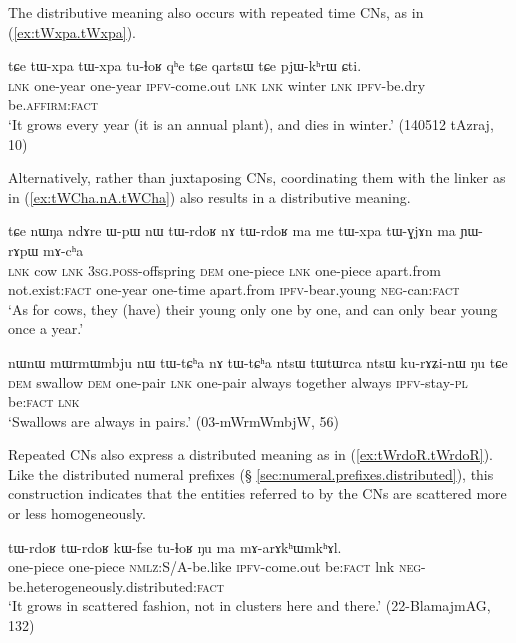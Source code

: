 The distributive meaning also occurs with repeated time CNs, as in (\ref{ex:tWxpa.tWxpa}).

\begin{exe}
\ex \label{ex:tWxpa.tWxpa}
\gll tɕe tɯ-xpa tɯ-xpa tu-ɬoʁ qʰe tɕe qartsɯ tɕe pjɯ-kʰrɯ ɕti. \\
 \textsc{lnk} one-year one-year \textsc{ipfv}-come.out \textsc{lnk} \textsc{lnk} winter \textsc{lnk}  \textsc{ipfv}-be.dry be.\textsc{affirm}:\textsc{fact} \\
\glt  `It grows every year (it is an annual plant), and dies in winter.' (140512 tAzraj, 10)
\end{exe}

Alternatively, rather than juxtaposing CNs, coordinating them with the linker  as in (\ref{ex:tWCha.nA.tWCha}) also results in a distributive meaning.

\begin{exe}
\ex \label{ex:tWrdoʁ.nA.tWrdoʁ}
\gll  tɕe nɯŋa ndɤre ɯ-pɯ nɯ tɯ-rdoʁ nɤ tɯ-rdoʁ ma me tɯ-xpa tɯ-ɣjɤn ma ɲɯ-rɤpɯ mɤ-cʰa \\
 \textsc{lnk} cow \textsc{lnk} \textsc{3sg}.\textsc{poss}-offspring \textsc{dem} one-piece \textsc{lnk} one-piece apart.from not.exist:\textsc{fact}  one-year one-time apart.from \textsc{ipfv}-bear.young \textsc{neg}-can:\textsc{fact} \\
\glt `As for cows, they (have) their young only one by one, and can only bear young once a year.'
\end{exe}

\begin{exe}
\ex \label{ex:tWCha.nA.tWCha}
\gll nɯnɯ mɯrmɯmbju nɯ tɯ-tɕʰa nɤ tɯ-tɕʰa ntsɯ tɯtɯrca ntsɯ ku-rɤʑi-nɯ ŋu tɕe \\
 \textsc{dem} swallow \textsc{dem} one-pair \textsc{lnk}  one-pair  always together always \textsc{ipfv}-stay-\textsc{pl} be:\textsc{fact} \textsc{lnk}  \\
\glt `Swallows are always in pairs.' (03-mWrmWmbjW, 56)
\end{exe}

Repeated CNs also express a distributed meaning as in (\ref{ex:tWrdoR.tWrdoR}). Like the distributed numeral prefixes (§ \ref{sec:numeral.prefixes.distributed}), this construction indicates that the entities referred to by the CNs are scattered more or less homogeneously.

\begin{exe}
\ex \label{ex:tWrdoR.tWrdoR}
\gll  tɯ-rdoʁ tɯ-rdoʁ kɯ-fse tu-ɬoʁ ŋu ma mɤ-arɤkʰɯmkʰɤl. \\
 one-piece one-piece \textsc{nmlz}:S/A-be.like \textsc{ipfv}-come.out  be:\textsc{fact} lnk \textsc{neg}-be.heterogeneously.distributed:\textsc{fact} \\
\glt `It grows in scattered fashion, not in clusters here and there.' (22-BlamajmAG, 132)
\end{exe}

